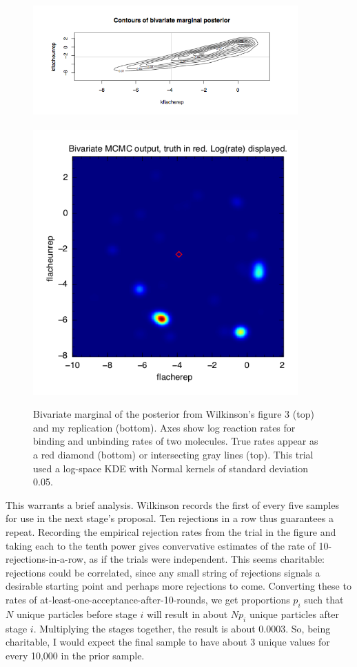 \documentclass{article}
\begin{document}

\begin{figure}[h!]
\begin{center}
\includegraphics[height=2in,width=4in]{wilkinson_fig3_biv.png}
\includegraphics[height=4in,width=4in]{SigD_trial_may27.png}
\caption{Bivariate marginal of the posterior from Wilkinson's figure 3 (top) and my replication (bottom). Axes show log reaction rates for binding and unbinding rates of two molecules. True rates appear as a red diamond (bottom) or intersecting gray lines (top). This trial used a log-space KDE with Normal kernels of standard deviation 0.05.}
\end{center}
\label{fig:SigD_trial_may27}
\end{figure}

This warrants a brief analysis. Wilkinson records the first of every five samples for use in the next stage's proposal. Ten rejections in a row thus guarantees a repeat. Recording the empirical rejection rates from the trial in the figure and taking each to the tenth power gives convervative estimates of the rate of 10-rejections-in-a-row, as if the trials were independent. This seems charitable: rejections could be correlated, since any small string of rejections signals a desirable starting point and perhaps more rejections to come. Converting these to rates of at-least-one-acceptance-after-10-rounds, we get proportions $p_i$ such that $N$ unique particles before stage $i$ will result in about $Np_i$ unique particles after stage $i$. Multiplying the stages together, the result is about 0.0003. So, being charitable, I would expect the final sample to have about 3 unique values for every 10,000 in the prior sample.
\end{document}
